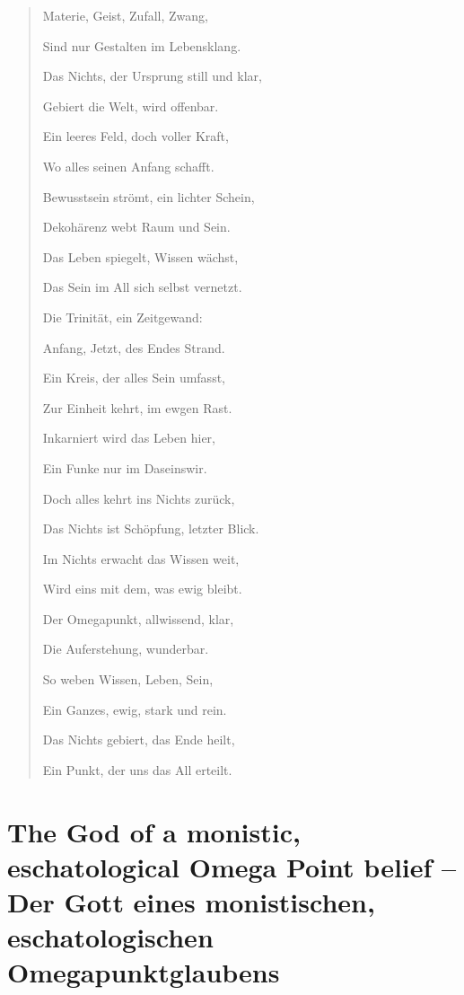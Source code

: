 \documentclass[
  ngerman,
]{article}
\begin{document}
\begin{quote}
Materie, Geist, Zufall, Zwang,

Sind nur Gestalten im Lebensklang.

Das Nichts, der Ursprung still und klar,

Gebiert die Welt, wird offenbar.

Ein leeres Feld, doch voller Kraft,

Wo alles seinen Anfang schafft.

Bewusstsein strömt, ein lichter Schein,

Dekohärenz webt Raum und Sein.

Das Leben spiegelt, Wissen wächst,

Das Sein im All sich selbst vernetzt.

Die Trinität, ein Zeitgewand:

Anfang, Jetzt, des Endes Strand.

Ein Kreis, der alles Sein umfasst,

Zur Einheit kehrt, im ew\textquotesingle gen Rast.

Inkarniert wird das Leben hier,

Ein Funke nur im Daseinswir.

Doch alles kehrt ins Nichts zurück,

Das Nichts ist Schöpfung, letzter Blick.

Im Nichts erwacht das Wissen weit,

Wird eins mit dem, was ewig bleibt.

Der Omegapunkt, allwissend, klar,

Die Auferstehung, wunderbar.

So weben Wissen, Leben, Sein,

Ein Ganzes, ewig, stark und rein.

Das Nichts gebiert, das Ende heilt,

Ein Punkt, der uns das All erteilt.
\end{quote}

\section{\texorpdfstring{\textbf{The God of a monistic, eschatological
Omega Point belief -- Der Gott eines monistischen, eschatologischen
Omegapunktglaubens}}{The God of a monistic, eschatological Omega Point belief -- Der Gott eines monistischen, eschatologischen Omegapunktglaubens}}\label{the-god-of-a-monistic-eschatological-omega-point-belief-der-gott-eines-monistischen-eschatologischen-omegapunktglaubens}
\end{document}
